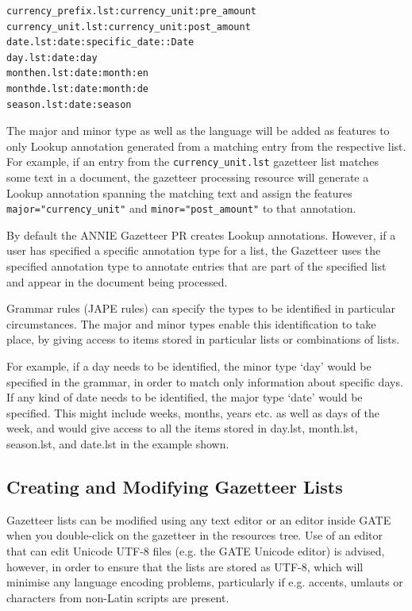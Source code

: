 \begin{small}\begin{verbatim}
currency_prefix.lst:currency_unit:pre_amount
currency_unit.lst:currency_unit:post_amount 
date.lst:date:specific_date::Date
day.lst:date:day
monthen.lst:date:month:en
monthde.lst:date:month:de
season.lst:date:season
\end{verbatim}\end{small}

The major and minor type as well as the language will be added as 
features to only Lookup annotation generated from a matching entry from
the respective list. For example, if an entry from the \texttt{currency\_unit.lst}
gazetteer list matches some text in a document, the gazetteer processing
resource will generate a Lookup annotation spanning the matching text
and assign the features \texttt{major="currency\_unit"} and 
\texttt{minor="post\_amount"} to that annotation.

By default the ANNIE Gazetteer PR creates Lookup annotations.  However,
if a user has specified a specific annotation type for a list, the Gazetteer uses
the specified annotation type to annotate entries that are part of the specified
list and appear in the document being processed. 

Grammar rules (JAPE rules) can specify the types to be identified in particular
circumstances. The major and minor types enable this identification to
take place, by giving access to items stored in particular lists or
combinations of lists.

For example, if a day needs to be identified, the minor
type `day' would be specified in the grammar, in order to match only
information about specific days. If any kind of date needs to be
identified, the major type `date' would be specified. This might
include weeks, months, years etc. as well as days of the week, and
would give access to all the items stored in day.lst, month.lst, season.lst,
and date.lst in the example shown.

\subsection{Creating and Modifying Gazetteer Lists}

Gazetteer lists can be modified using any text editor or an editor inside GATE
when you double-click on the gazetteer in the resources tree. Use of an
editor that can edit Unicode UTF-8 files (e.g. the GATE Unicode editor) is
advised, however, in order to ensure that the lists are stored as UTF-8,
which will minimise any language encoding problems, particularly if
e.g. accents, umlauts or characters from non-Latin scripts are present.

